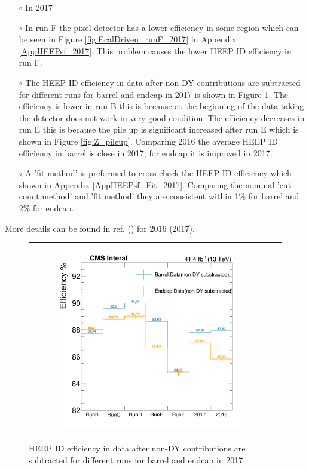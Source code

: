 \begin{itemize}
  \item[$\circ$] In 2017
  \item[$\circ$] In run F the pixel detector has a lower efficiency in some region which can be seen in Figure \ref{fig:EcalDriven_runF_2017} in Appendix \ref{AppHEEPsf_2017}. This problem causes the lower HEEP ID efficiency in run F.
  \item[$\circ$] The HEEP ID efficiency in data after non-DY contributions are subtracted for different runs for barrel and endcap in 2017 is shown in Figure \ref{fig:Runs_HEEP_eff_rereco_2017}. The efficiency is lower in run B this is because at the beginning of the data taking the detector does not work in very good condition. The efficiency decreases in run E this is because the pile up is significant increased after run E which is shown in Figure \ref{fig:Z_pileup}. Comparing 2016 the average HEEP ID efficiency in barrel is close in 2017, for endcap it is improved in 2017.
  \item[$\circ$] A 'fit method' is preformed to cross check the HEEP ID efficiency which shown in Appendix \ref{AppHEEPsf_Fit_2017}. Comparing the nominal 'cut count method' and 'fit method' they are consistent within 1\% for barrel and 2\% for endcap.
  \end{itemize}
More details can be found in ref. \cite{SF_ref1} (\cite{SF_ref2}) for 2016 (2017).

\begin{figure}[bh]
  \begin{center}
    \begin{tabular}{cc}
      \includegraphics[width=0.8\textwidth]{figures/Zprime/2017/ScaleFactor/SameSign/Runs_HEEP_eff_rereco.png}
    \end{tabular}
    \caption{HEEP ID efficiency in data after non-DY contributions are subtracted for different runs for barrel and endcap in 2017.}
    \label{fig:Runs_HEEP_eff_rereco_2017}
  \end{center}
\end{figure}



